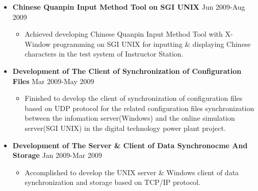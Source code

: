 \documentclass[a4paper, 10pt, titlepage]{article}
\begin{document}
\begin{itemize}
\item \textbf{Chinese Quanpin Input Method Tool on SGI UNIX} \hfill \textrm{Jun 2009-Aug 2009}
  \begin{itemize}
  \item Achieved developing Chinese Quanpin Input Method Tool with X-Window programming on SGI UNIX for inputting \& displaying Chinese characters in the test system of Instructor Station.
  \end{itemize}

\item \textbf{Development of The Client of Synchronization of Configuration Files} \hfill \textrm{Mar 2009-May 2009}
  \begin{itemize}
   \item Finished to develop the client of synchronization of configuration files based on UDP protocol for the related configuration files synchronization between the infomation server(Windows) and the online simulation server(SGI UNIX) in the digital technology power plant project.\\
  \end{itemize}

\item \textbf{Development of The Server \& Client of Data Synchronocme And Storage} \hfill \textrm{Jan 2009-Mar 2009}
  \begin{itemize}
    \item Accomplished to develop the UNIX server \& Windows client of data synchronization and storage based on TCP/IP protocol.
  \end{itemize}

\end{itemize}

\end{document}
